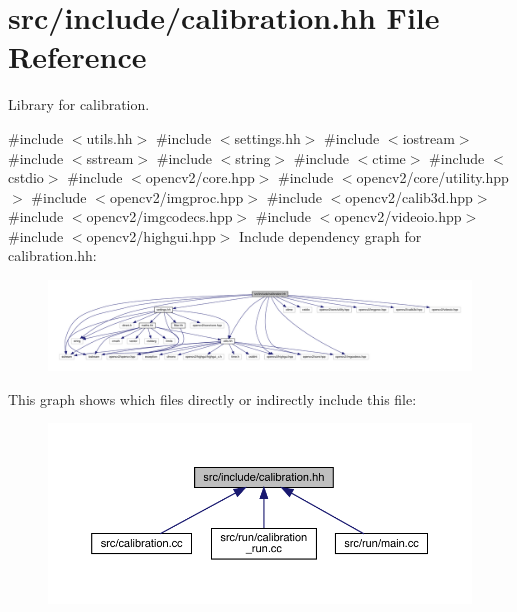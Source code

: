\hypertarget{calibration_8hh}{}\section{src/include/calibration.hh File Reference}
\label{calibration_8hh}


Library for calibration.  


{\ttfamily \#include $<$utils.\+hh$>$}\newline
{\ttfamily \#include $<$settings.\+hh$>$}\newline
{\ttfamily \#include $<$iostream$>$}\newline
{\ttfamily \#include $<$sstream$>$}\newline
{\ttfamily \#include $<$string$>$}\newline
{\ttfamily \#include $<$ctime$>$}\newline
{\ttfamily \#include $<$cstdio$>$}\newline
{\ttfamily \#include $<$opencv2/core.\+hpp$>$}\newline
{\ttfamily \#include $<$opencv2/core/utility.\+hpp$>$}\newline
{\ttfamily \#include $<$opencv2/imgproc.\+hpp$>$}\newline
{\ttfamily \#include $<$opencv2/calib3d.\+hpp$>$}\newline
{\ttfamily \#include $<$opencv2/imgcodecs.\+hpp$>$}\newline
{\ttfamily \#include $<$opencv2/videoio.\+hpp$>$}\newline
{\ttfamily \#include $<$opencv2/highgui.\+hpp$>$}\newline
Include dependency graph for calibration.\+hh\+:
\nopagebreak
\begin{figure}[H]
\begin{center}
\leavevmode
\includegraphics[width=350pt]{calibration_8hh__incl}
\end{center}
\end{figure}
This graph shows which files directly or indirectly include this file\+:
\nopagebreak
\begin{figure}[H]
\begin{center}
\leavevmode
\includegraphics[width=350pt]{calibration_8hh__dep__incl}
\end{center}
\end{figure}
